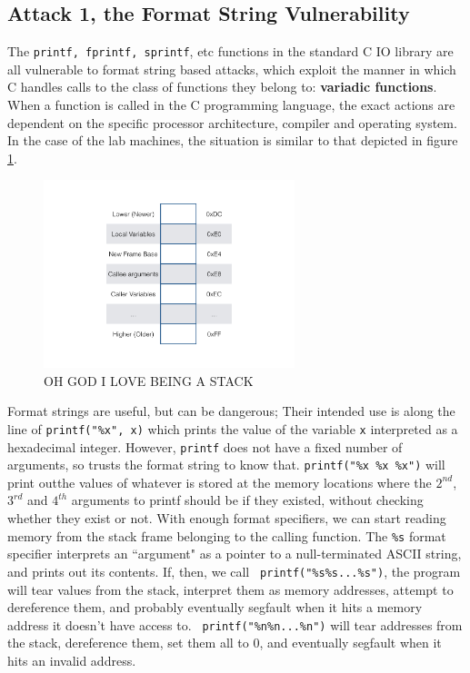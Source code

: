 \subsection{Attack 1, the Format String Vulnerability}

The {\tt printf, fprintf, sprintf}, etc functions in the standard C IO library are all vulnerable to format string based
attacks, which exploit the manner in which C handles calls to the class of functions they belong to: \textbf{variadic
functions}\cite{vfunc}. When a function is called in the C programming language,\cite{call_conv}
the exact actions are dependent on the specific processor architecture, compiler and operating system.
In the case of the lab machines, the situation is similar to that depicted in figure \ref{fig_stack}.

\begin{figure}[ht] \centering \includegraphics[width = 0.65\textwidth]{./images/stack.jpg} \caption{OH GOD I LOVE BEING
A STACK} \label{fig_stack} \end{figure}

Format strings are useful, but can be dangerous; Their intended use is along the line of {\tt printf("\%x", x)} which
prints the value of the variable {\tt x} interpreted as a hexadecimal integer. However, {\tt printf} does not have a
fixed number of arguments, so trusts the format string to know that. {\tt printf("\%x \%x \%x")} will print outthe
values of whatever is stored at the memory locations where the $2^{nd}$, $3^{rd}$ and $4^{th}$ arguments to printf
should be if they existed, without checking whether they exist or not. With enough format specifiers, we can start
reading memory from the stack frame belonging to the calling function. The {\tt \%s} format specifier interprets an
``argument" as a pointer to a null-terminated ASCII string, and prints out its contents. If, then, we call {\tt
printf("\%s\%s...\%s")}, the program will tear values from the stack, interpret them as memory addresses, attempt to
dereference them, and probably eventually segfault when it hits a memory address it doesn't have access to. {\tt
printf("\%n\%n...\%n")} will tear addresses from the stack, dereference them, set them all to 0, and eventually segfault
when it hits an invalid address.

